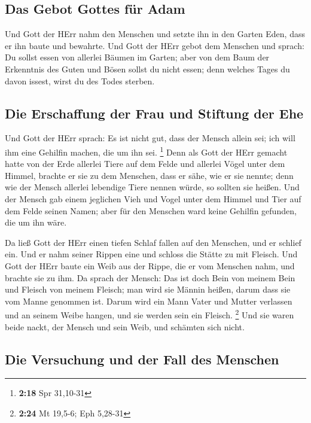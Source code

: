 \hypertarget{das-gebot-gottes-fuxfcr-adam}{%
\subsection{Das Gebot Gottes für
Adam}\label{das-gebot-gottes-fuxfcr-adam}}

 Und Gott der HErr nahm den Menschen und setzte ihn in
den Garten Eden, dass er ihn baute und bewahrte.  Und
Gott der HErr gebot dem Menschen und sprach: Du sollst essen von
allerlei Bäumen im Garten;  aber von dem Baum der
Erkenntnis des Guten und Bösen sollst du nicht essen; denn welches Tages
du davon issest, wirst du des Todes sterben.

\hypertarget{die-erschaffung-der-frau-und-stiftung-der-ehe}{%
\subsection{Die Erschaffung der Frau und Stiftung der
Ehe}\label{die-erschaffung-der-frau-und-stiftung-der-ehe}}

 Und Gott der HErr sprach: Es ist nicht gut, dass der
Mensch allein sei; ich will ihm eine Gehilfin machen, die um ihn sei.
\footnote{\textbf{2:18} Spr 31,10-31}  Denn als Gott der
HErr gemacht hatte von der Erde allerlei Tiere auf dem Felde und
allerlei Vögel unter dem Himmel, brachte er sie zu dem Menschen, dass er
sähe, wie er sie nennte; denn wie der Mensch allerlei lebendige Tiere
nennen würde, so sollten sie heißen.  Und der Mensch gab
einem jeglichen Vieh und Vogel unter dem Himmel und Tier auf dem Felde
seinen Namen; aber für den Menschen ward keine Gehilfin gefunden, die um
ihn wäre.

 Da ließ Gott der HErr einen tiefen Schlaf fallen auf den
Menschen, und er schlief ein. Und er nahm seiner Rippen eine und schloss
die Stätte zu mit Fleisch.  Und Gott der HErr baute ein
Weib aus der Rippe, die er vom Menschen nahm, und brachte sie zu ihm.
 Da sprach der Mensch: Das ist doch Bein von meinem Bein
und Fleisch von meinem Fleisch; man wird sie Männin heißen, darum dass
sie vom Manne genommen ist.  Darum wird ein Mann Vater
und Mutter verlassen und an seinem Weibe hangen, und sie werden sein ein
Fleisch. \footnote{\textbf{2:24} Mt 19,5-6; Eph 5,28-31} 
Und sie waren beide nackt, der Mensch und sein Weib, und schämten sich
nicht.

\hypertarget{die-versuchung-und-der-fall-des-menschen}{%
\subsection{Die Versuchung und der Fall des
Menschen}\label{die-versuchung-und-der-fall-des-menschen}}

